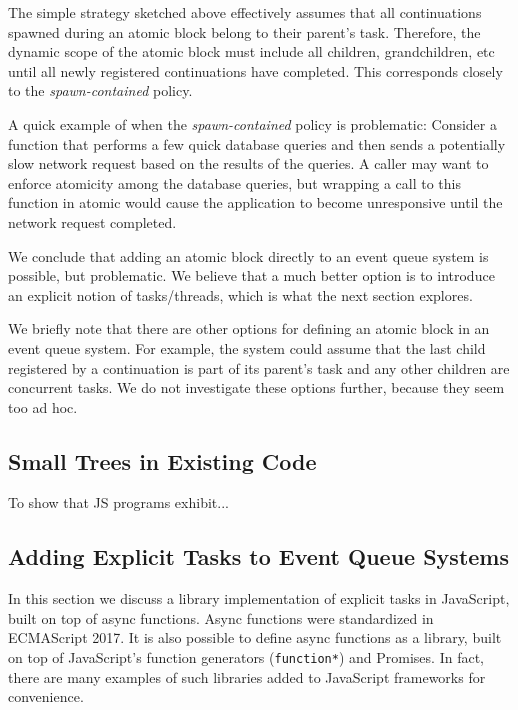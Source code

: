 \documentclass[acmsmall,anonymous,review]{acmart}\settopmatter{printfolios=true,printccs=false,printacmref=false}
\begin{document}
The simple strategy sketched above effectively assumes that all continuations spawned during an atomic block belong to their parent's task.
Therefore, the dynamic scope of the atomic block must include all children, grandchildren, etc until all newly registered continuations have completed.
This corresponds closely to the \emph{spawn-contained} policy.

A quick example of when the \emph{spawn-contained} policy is problematic:
Consider a function that performs a few quick database queries and then sends a potentially slow network request based on the results of the queries.
A caller may want to enforce atomicity among the database queries, but wrapping a call to this function in atomic would cause the application to become unresponsive until the network request completed.

We conclude that adding an atomic block directly to an event queue system is possible, but problematic.
We believe that a much better option is to introduce an explicit notion of tasks/threads, which is what the next section explores.

We briefly note that there are other options for defining an atomic block in an event queue system.
For example, the system could assume that the last child registered by a continuation is part of its parent's task and any other children are concurrent tasks.
We do not investigate these options further, because they seem too ad hoc.

\subsection{Small Trees in Existing Code}

To show that JS programs exhibit...

\subsection{Adding Explicit Tasks to Event Queue Systems}

In this section we discuss a library implementation of explicit tasks in JavaScript, built on top of async functions.
Async functions were standardized in ECMAScript 2017.
It is also possible to define async functions as a library, built on top of JavaScript's function generators (\texttt{function*}) and Promises.
In fact, there are many examples of such libraries added to JavaScript frameworks for convenience.
\end{document}

